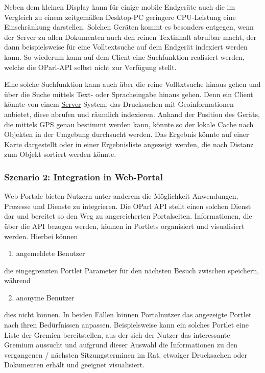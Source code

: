 \documentclass[,a4paper]{article}
\begin{document}
Neben dem kleinen Display kann für einige mobile Endgeräte auch die im
Vergleich zu einem zeitgemäßen Desktop-PC geringere CPU-Leistung eine
Einschränkung darstellen. Solchen Geräten kommt es besonders entgegen,
wenn der Server zu allen Dokumenten auch den reinen Textinhalt abrufbar
macht, der dann beispielsweise für eine Volltextsuche auf dem Endgerät
indexiert werden kann. So wiederum kann auf dem Client eine Suchfunktion
realisiert werden, welche die OParl-API selbst nicht zur Verfügung
stellt.

Eine solche Suchfunktion kann auch über die reine Volltxtsuche hinaus
gehen und über die Suche mittels Text- oder Spracheingabe hinaus gehen.
Denn ein Client könnte von einem \hyperref[server]{Server}-System, das
Drucksachen mit Geoinformationen anbietet, diese abrufen und räumlich
indexieren. Anhand der Position des Geräts, die mittels GPS genau
bestimmt werden kann, könnte so der lokale Cache nach Objekten in der
Umgebung durchsucht werden. Das Ergebnis könnte auf einer Karte
dargestellt oder in einer Ergebnisliste angezeigt werden, die nach
Distanz zum Objekt sortiert werden könnte.

\subsubsection{Szenario 2: Integration in Web-Portal}

Web Portale bieten Nutzern unter anderem die Möglichkeit Anwendungen,
Prozesse und Dienste zu integrieren. Die OParl API stellt einen solchen
Dienst dar und bereitet so den Weg zu angereicherten Portalseiten.
Informationen, die über die API bezogen werden, können in Portlets
organisiert und visualisiert werden. Hierbei können

\begin{enumerate}[1.]
\item
  angemeldete Benutzer
\end{enumerate}

die eingegrenzten Portlet Parameter für den nächsten Besuch zwischen
speichern, während

\begin{enumerate}[1.]
\setcounter{enumi}{1}
\item
  anonyme Benutzer
\end{enumerate}

dies nicht können. In beiden Fällen können Portalnutzer das angezeigte
Portlet nach ihren Bedürfnissen anpassen. Beispielsweise kann ein
solches Portlet eine Liste der Gremien bereitstellen, aus der sich der
Nutzer das interessante Gremium aussucht und aufgrund dieser Auswahl die
Informationen zu den vergangenen / nächsten Sitzungsterminen im Rat,
etwaiger Drucksachen oder Dokumenten erhält und geeignet visualisiert.
\end{document}
